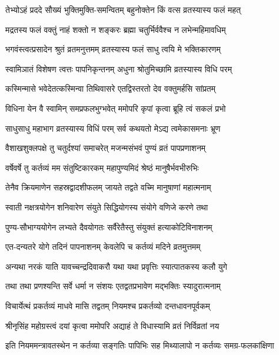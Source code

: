 \twolineshloka
{तेभ्योऽहं प्रददे सौख्यं भुक्तिमुक्ति-समन्वितम्}
{बहुनोक्तेन किं वत्स व्रतस्यास्य फलं महत्} %

\twolineshloka
{मद्रतस्य फलं वक्तुं नाहं शक्तो न शङ्करः}
{ब्रह्मा चतुर्भिर्ववैश्च न लभेन्महिमावधिम्} %

\twolineshloka
{भगवंस्त्वत्प्रसादेन श्रुतं व्रतमनुत्तमम्}
{व्रतस्यास्य फलं साधु त्वयि मे भक्तिकारणम्} %

\twolineshloka
{स्वामिञातं विशेषण त्वत्तः पापनिकृन्तनम्}
{अधुना श्रोतुमिच्छामि व्रतस्यास्य विधि परम्} %

\twolineshloka
{कस्मिन्मासे भवेदेतत्कस्मिन्वा तिथिवासरे}
{एतद्विस्तरतो देव वक्तुमर्हसि सांप्रतम्} %

\twolineshloka
{विधिना येन वै स्वामिन् समप्रफलभुग्भवेत्}
{ममोपरि कृपां कृत्वा ब्रूहि त्वं सकलं प्रभो} %


\twolineshloka
{साधुसाधु महाभाग व्रतस्यास्य विधिं परम्}
{सर्व कथयतो मेऽद्य त्वमेकासमनाः भ्रूण} %

\twolineshloka
{वैशाखशुक्लपक्षे तु चतुर्दश्यां समाचरेत्}
{मजन्मसंभवं पुण्यं व्रतं पापप्रणाशनम्} %


\twolineshloka
{वर्षेवर्षे तु कर्तव्यं मम संतुष्टिकारकम्}
{महापुण्यमिदं श्रेष्ठं मानुषैर्भवभीरुभिः} %

\twolineshloka
{तेनैव क्रियमाणेन सहस्रद्वादशीफलम्}
{जायते तद्वते वच्मि मानुषाणां महात्मनाम्} %

\twolineshloka
{स्वाती नक्षत्रयोगेन शनिवारेण संयुते}
{सिद्धियोगस्य संयोगे वणिजे करणे तथा} %

\twolineshloka
{पुण्य-सौभाग्ययोगेन लभ्यते दैवयोगतः}
{सर्वैरेतैस्तु संयुक्तं हत्याकोटिविनाशनम्} %

\twolineshloka
{एत-दन्यतरे योगे तदिनं पापनाशनम्}
{केवलेपि च कर्तव्यं मदिने व्रतमुत्तमम्} %

\twolineshloka
{अन्यथा नरकं याति यावच्चन्द्रदिवाकरौ}
{यथा यथा प्रवृत्तिः स्यात्पातकस्य कलौ युगे} %

\twolineshloka
{तथा तथा प्रणश्यन्ति सर्वे धर्मा न संशयः}
{एतद्वतप्रभावेण मद्भक्तिः स्यादुरात्मनाम्} %


\twolineshloka
{विचार्येत्थं प्रकर्तव्यं माधवे मासि तद्वतम्}
{नियमश्च प्रकर्तव्यो दन्तधावनपूर्वकम्} %


\twolineshloka
{श्रीनृसिंह महोग्रस्त्वं दयां कृत्वा ममोपरि}
{अद्याहं ते विधास्यामि व्रतं निर्विव्रतां नय} %


\twolineshloka
{इति नियममन्त्रावतस्थेन न कर्तव्या सङ्गतिः पापिभिः सह}
{मिथ्यालापो न कर्तव्यः समग्र-फलकांक्षिणा} %

